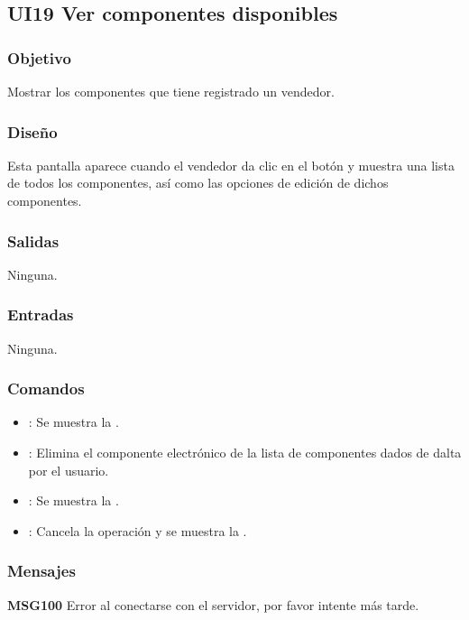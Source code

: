 \subsection{UI19 Ver componentes disponibles}

\subsubsection{Objetivo}
	Mostrar los componentes que tiene registrado un vendedor.

\subsubsection{Diseño}
	Esta pantalla aparece cuando el vendedor da clic en el botón  y muestra una lista de todos los componentes, así como las opciones de edición de dichos componentes.


\subsubsection{Salidas}

	Ninguna.

\subsubsection{Entradas}
	Ninguna.

\subsubsection{Comandos}
\begin{itemize}
	\item {}: Se muestra la .
	\item {}: Elimina el componente electrónico de la lista de componentes dados de dalta por el usuario.
	\item {}: Se muestra la .
	\item {}: Cancela la operación y se muestra la .
\end{itemize}

\subsubsection{Mensajes}
	\begin{Citemize}
		\item {\bf MSG100} Error al conectarse con el servidor, por favor intente más tarde.
	\end{Citemize}